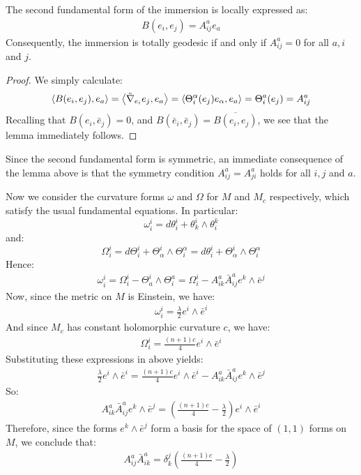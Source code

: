 \begin{lem} The second fundamental form of the immersion is locally expressed as:
%
\begin{align}
B( e_i, e_j ) = A^a_{ij} e_a
\end{align}
%
Consequently, the immersion is totally geodesic if and only if $A^a_{ij} = 0$ for all $a,i$ and $j$.
%
\end{lem}

\begin{proof} We simply calculate:
%
\begin{align*}
\left\langle B(e_i, e_j), e_a \right\rangle = \left\langle \tilde{\nabla}_{e_i} e_j, e_a \right\rangle = \left\langle \Theta^{\alpha}_i (e_j) e_{\alpha}, e_a \right\rangle = \Theta^a_i (e_j) = A^a_{ij}
\end{align*}
%
Recalling that $B(e_i, \bar{e}_j) = 0$, and $B(\bar{e}_i, \bar{e}_j ) = \overline{ B(e_i, e_j ) }$, we see that the lemma immediately follows.
%
\end{proof}

Since the second fundamental form is symmetric, an immediate consequence of the lemma above is that the symmetry condition $A^a_{ij} = A^a_{ji}$ holds for all $i,j$ and $a$.

Now we consider the curvature forms $\omega$ and $\Omega$ for $M$ and $M_c$ respectively, which satisfy the usual fundamental equations.  In particular:
%
$$\omega^i_i = d \theta^i_i + \theta^i_k \wedge \theta^k_i$$ 
%
and:
%
$$\Omega^i_i = d \Theta^i_i + \Theta^i_{\alpha} \wedge \Theta^{\alpha}_i = d \theta^i_i + \Theta^i_{\alpha} \wedge \Theta^{\alpha}_i$$
%
Hence:
%
\begin{align*}
\omega^i_i = \Omega^i_i - \Theta^i_a \wedge \Theta^a_i = \Omega^i_i - A^a_{ik} \bar{A}^a_{ij} e^k \wedge \bar{e}^j
\end{align*}
%
Now, since the metric on $M$ is Einstein, we have:
%
\begin{align*}
\omega^i_i = \frac{\lambda}{2} e^i \wedge \bar{e}^i
\end{align*}
%
And since $M_c$ has constant holomorphic curvature $c$, we have:
%
\begin{align*}
\Omega^i_i = \frac{(n+1)c}{4} e^i \wedge \bar{e}^i
\end{align*}
%
Substituting these expressions in above yields:
%
\begin{align*}
\frac{\lambda}{2} e^i \wedge \bar{e}^i = \frac{(n+1)c}{4} e^i \wedge \bar{e}^i - A^a_{ik} \bar{A}^a_{ij} e^k \wedge \bar{e}^j
\end{align*}
%
So:
%
\begin{align*}
A^a_{ik} \bar{A}^a_{ij} e^k \wedge \bar{e}^j = \left( \frac{(n+1)c}{4} - \frac{\lambda}{2} \right) e^i \wedge \bar{e}^i
\end{align*}
%
Therefore, since the forms $e^k \wedge \bar{e}^j$ form a basis for the space of $(1,1)$ forms on $M$, we conclude that:
%
\begin{align}
A^a_{ij} \bar{A}^a_{ik} = \delta^j_k \left( \frac{(n+1)c}{4} - \frac{\lambda}{2} \right)
\end{align}

